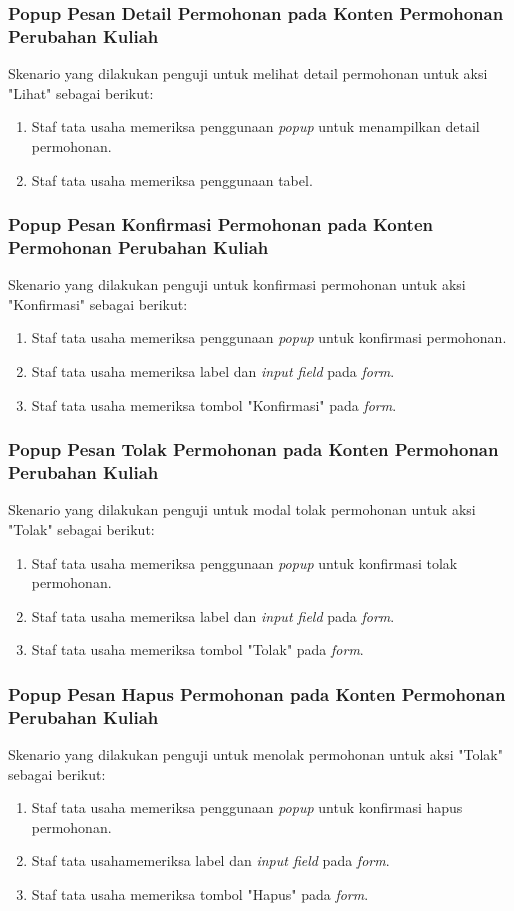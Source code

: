 \subsubsection{Popup Pesan Detail Permohonan pada Konten Permohonan Perubahan Kuliah}
Skenario yang dilakukan penguji untuk melihat detail permohonan untuk aksi "Lihat" sebagai berikut:
\begin{enumerate}
	\item Staf tata usaha memeriksa penggunaan \textit{popup} untuk menampilkan detail permohonan.	
	\item Staf tata usaha memeriksa penggunaan tabel.	
\end{enumerate}

\subsubsection{Popup Pesan Konfirmasi Permohonan pada Konten Permohonan Perubahan Kuliah}
Skenario yang dilakukan penguji untuk konfirmasi permohonan untuk aksi "Konfirmasi" sebagai berikut:
\begin{enumerate}
	\item Staf tata usaha memeriksa penggunaan \textit{popup} untuk konfirmasi permohonan.
	\item Staf tata usaha memeriksa label dan \textit{input field} pada \textit{form}.
	\item Staf tata usaha memeriksa tombol "Konfirmasi" pada \textit{form}.	
\end{enumerate}

\subsubsection{Popup Pesan Tolak Permohonan pada Konten Permohonan Perubahan Kuliah}
Skenario yang dilakukan penguji untuk modal tolak permohonan untuk aksi "Tolak" sebagai berikut:
\begin{enumerate}
	\item Staf tata usaha memeriksa penggunaan \textit{popup} untuk konfirmasi tolak permohonan.
	\item Staf tata usaha memeriksa label dan \textit{input field} pada \textit{form}.
	\item Staf tata usaha memeriksa tombol "Tolak" pada \textit{form}.	
\end{enumerate}

\subsubsection{Popup Pesan Hapus Permohonan pada Konten Permohonan Perubahan Kuliah}
Skenario yang dilakukan penguji untuk menolak permohonan untuk aksi "Tolak" sebagai berikut:
\begin{enumerate}
	\item Staf tata usaha memeriksa penggunaan \textit{popup} untuk konfirmasi hapus permohonan.
	\item Staf tata usahamemeriksa label dan \textit{input field} pada \textit{form}.
	\item Staf tata usaha memeriksa tombol "Hapus" pada \textit{form}.	
\end{enumerate}

